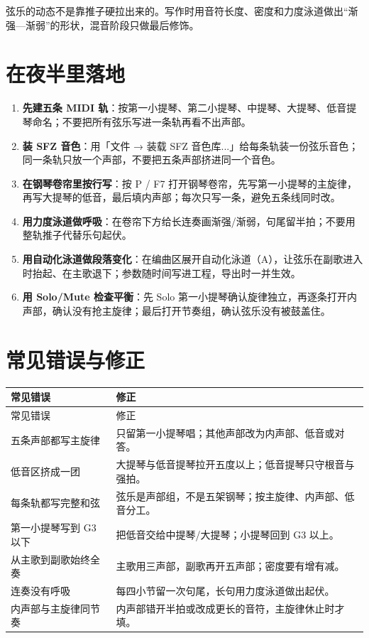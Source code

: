 弦乐的动态不是靠推子硬拉出来的。写作时用音符长度、密度和力度泳道做出“渐强—渐弱”的形状，混音阶段只做最后修饰。

\section{在夜半里落地}
\label{sec:string-yeban}

\begin{enumerate}
\item \textbf{先建五条 MIDI 轨}：按第一小提琴、第二小提琴、中提琴、大提琴、低音提琴命名；不要把所有弦乐写进一条轨再看不出声部。
\item \textbf{装 SFZ 音色}：用「文件 → 装载 SFZ 音色库...」给每条轨装一份弦乐音色；同一条轨只放一个声部，不要把五条声部挤进同一个音色。
\item \textbf{在钢琴卷帘里按行写}：按 P / F7 打开钢琴卷帘，先写第一小提琴的主旋律，再写大提琴的低音，最后填内声部；每次只写一条，避免五条线同时改。
\item \textbf{用力度泳道做呼吸}：在卷帘下方给长连奏画渐强/渐弱，句尾留半拍；不要用整轨推子代替乐句起伏。
\item \textbf{用自动化泳道做段落变化}：在编曲区展开自动化泳道（A），让弦乐在副歌进入时抬起、在主歌退下；参数随时间写进工程，导出时一并生效。
\item \textbf{用 Solo/Mute 检查平衡}：先 Solo 第一小提琴确认旋律独立，再逐条打开内声部，确认没有抢主旋律；最后打开节奏组，确认弦乐没有被鼓盖住。
\end{enumerate}


\section{常见错误与修正}
\label{sec:string-mistakes}

\begin{longtable}{p{}p{}}
\toprule
常见错误 & 修正 \\
\midrule
\endfirsthead
\toprule
常见错误 & 修正 \\
\midrule
\endhead
五条声部都写主旋律 & 只留第一小提琴唱；其他声部改为内声部、低音或对答。 \\
低音区挤成一团 & 大提琴与低音提琴拉开五度以上；低音提琴只守根音与强拍。 \\
每条轨都写完整和弦 & 弦乐是声部组，不是五架钢琴；按主旋律、内声部、低音分工。 \\
第一小提琴写到 G3 以下 & 把低音交给中提琴/大提琴；小提琴回到 G3 以上。 \\
从主歌到副歌始终全奏 & 主歌用三声部，副歌再开五声部；密度要有增有减。 \\
连奏没有呼吸 & 每四小节留一次句尾，长句用力度泳道做出起伏。 \\
内声部与主旋律同节奏 & 内声部错开半拍或改成更长的音符，主旋律休止时才填。 \\
\bottomrule
\end{longtable}

